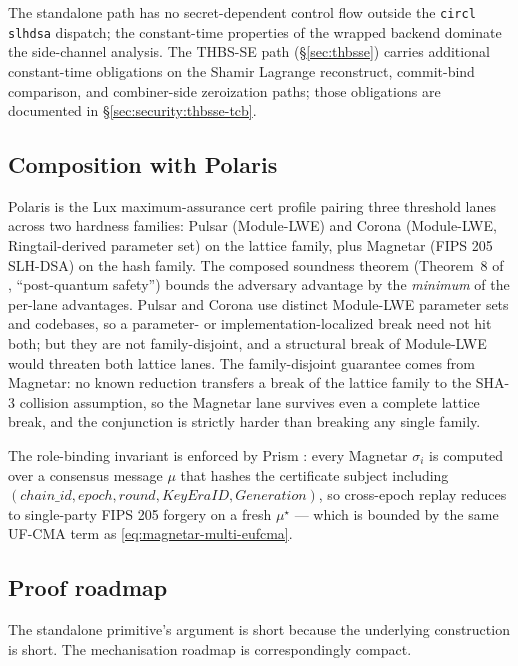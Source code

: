 The standalone path has no secret-dependent control flow outside
the \texttt{circl} \texttt{slhdsa} dispatch; the constant-time
properties of the wrapped backend dominate the side-channel
analysis. The THBS-SE path (\S\ref{sec:thbsse}) carries
additional constant-time obligations on the Shamir Lagrange
reconstruct, commit-bind comparison, and combiner-side
zeroization paths; those obligations are documented in
\S\ref{sec:security:thbsse-tcb}.

\subsection{Composition with Polaris}
\label{sec:security:polaris}

Polaris is the Lux maximum-assurance cert profile pairing three
threshold lanes across two hardness families: Pulsar
(Module-LWE) and Corona (Module-LWE, Ringtail-derived parameter
set) on the lattice family, plus Magnetar (FIPS 205 SLH-DSA) on
the hash family. The composed soundness theorem (Theorem~8 of
\cite{quasarcertsoundness}, ``post-quantum safety'') bounds the
adversary advantage by the \emph{minimum} of the per-lane
advantages. Pulsar and Corona use distinct Module-LWE parameter
sets and codebases, so a parameter- or implementation-localized
break need not hit both; but they are not family-disjoint, and a
structural break of Module-LWE would threaten both lattice lanes.
The family-disjoint guarantee comes from Magnetar: no known
reduction transfers a break of the lattice family to the SHA-3
collision assumption, so the Magnetar lane survives even a
complete lattice break, and the conjunction is strictly harder
than breaking any single family.

The role-binding invariant is enforced by Prism
\cite{lp073pulsarpaper}: every Magnetar
$\sigma_i$ is computed over a consensus message $\mu$ that
hashes the certificate subject including
$(\mathit{chain\_id}, \mathit{epoch}, \mathit{round},
\mathit{KeyEraID}, \mathit{Generation})$, so cross-epoch replay
reduces to single-party FIPS 205 forgery on a fresh $\mu^\star$
--- which is bounded by the same UF-CMA term as
\eqref{eq:magnetar-multi-eufcma}.

\subsection{Proof roadmap}
\label{sec:security:roadmap}

The standalone primitive's argument is short because the
underlying construction is short. The mechanisation roadmap is
correspondingly compact.


